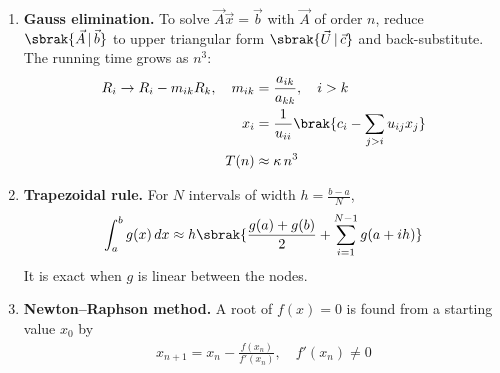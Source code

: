 \begin{enumerate}[label=\thesubsection.\arabic*, ref=\thesubsection.\theenumi, itemsep=0pt]
\begin{align}
\max\ \vec{c}^{\top}\vec{x} \quad \text{s.t.} \quad \vec{A}\vec{x} \leq \vec{b}, \ \vec{x} \geq \vec{0}
\label{eq:EE26BTECH11225-lpp}
\end{align}
If the dual values $\bm{\lambda} \geq \vec{0}$ returned by the solver satisfy $\vec{A}^{\top}\bm{\lambda} = \vec{c}$, then every feasible $\vec{x}$ obeys
\begin{align}
\vec{c}^{\top}\vec{x} = \bm{\lambda}^{\top}\vec{A}\vec{x} \leq \bm{\lambda}^{\top}\vec{b}
\label{eq:EE26BTECH11225-lpp-dual}
\end{align}
so an $\vec{x}^*$ with $\vec{c}^{\top}\vec{x}^* = \vec{b}^{\top}\bm{\lambda}$ is optimal.
\item \textbf{Gauss elimination.} To solve $\vec{A}\vec{x} = \vec{b}$ with $\vec{A}$ of order $n$, reduce $\sbrak{\vec{A} \,|\, \vec{b}}$ to upper triangular form $\sbrak{\vec{U} \,|\, \vec{c}}$ and back-substitute. The running time grows as $n^3$:
\begin{align}
R_i \to R_i - m_{ik}R_k, \quad m_{ik} &= \frac{a_{ik}}{a_{kk}}, \quad i > k
\label{eq:EE26BTECH11225-gauss-mult} \\
x_i &= \frac{1}{u_{ii}}\brak{c_i - \sum_{j > i}u_{ij}x_j}
\label{eq:EE26BTECH11225-gauss-back} \\
T(n) &\approx \kappa\, n^3
\label{eq:EE26BTECH11225-gauss-cost}
\end{align}
\item \textbf{Trapezoidal rule.} For $N$ intervals of width $h = \frac{b-a}{N}$,
\begin{align}
\int_a^b g(x)\,dx \approx h\sbrak{\frac{g(a) + g(b)}{2} + \sum_{i=1}^{N-1}g(a + ih)}
\label{eq:EE26BTECH11225-trapezoid}
\end{align}
It is exact when $g$ is linear between the nodes.
\item \textbf{Newton--Raphson method.} A root of $f(x) = 0$ is found from a starting value $x_0$ by
\begin{align}
x_{n+1} = x_n - \frac{f(x_n)}{f'(x_n)}, \quad f'(x_n) \neq 0
\label{eq:12-newton}
\end{align}
\end{enumerate}
